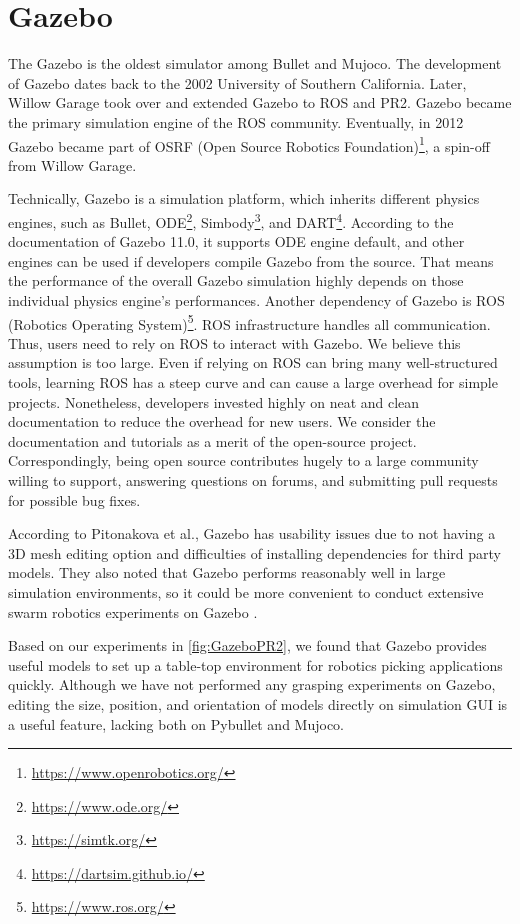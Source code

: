 \section{Gazebo}

The Gazebo is the oldest simulator among Bullet and Mujoco. The development of Gazebo dates back to the 2002 University of Southern California. Later, Willow Garage took over and extended Gazebo to ROS and PR2. Gazebo became the primary simulation engine of the ROS community. Eventually, in 2012 Gazebo became part of OSRF (Open Source Robotics Foundation)\footnote{\url{https://www.openrobotics.org/}}, a spin-off from Willow Garage.

Technically, Gazebo is a simulation platform, which inherits different physics engines, such as Bullet, ODE\footnote{\url{https://www.ode.org/}}, Simbody\footnote{\url{https://simtk.org/}}, and DART\footnote{\url{https://dartsim.github.io/}}. According to the documentation of Gazebo 11.0, it supports ODE engine default, and other engines can be used if developers compile Gazebo from the source. That means the performance of the overall Gazebo simulation highly depends on those individual physics engine's performances.  Another dependency of Gazebo is ROS (Robotics Operating System)\footnote{\url{https://www.ros.org/}}. ROS infrastructure handles all communication. Thus, users need to rely on ROS to interact with Gazebo. We believe this assumption is too large. Even if relying on ROS can bring many well-structured tools, learning ROS has a steep curve and can cause a large overhead for simple projects.
Nonetheless, developers invested highly on neat and clean documentation to reduce the overhead for new users. We consider the documentation and tutorials as a merit of the open-source project. Correspondingly, being open source contributes hugely to a large community willing to support, answering questions on forums, and submitting pull requests for possible bug fixes. 

According to Pitonakova et al., Gazebo has usability issues due to not having a 3D mesh editing option and difficulties of installing dependencies for third party models. They also noted that Gazebo performs reasonably well in large simulation environments, so it could be more convenient to conduct extensive swarm robotics experiments on Gazebo \cite{Pitonakova2018}.  

Based on our experiments in \ref{fig:GazeboPR2}, we found that Gazebo provides useful models to set up a table-top environment for robotics picking applications quickly. Although we have not performed any grasping experiments on Gazebo, editing the size, position, and orientation of models directly on simulation GUI is a useful feature, lacking both on Pybullet and Mujoco.


